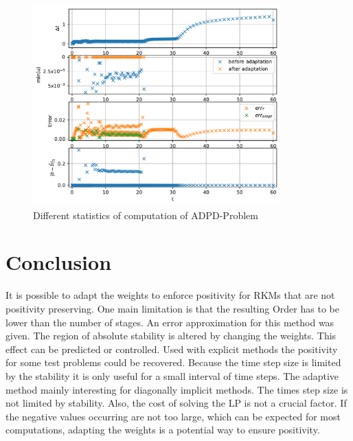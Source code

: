 \documentclass[a4paper]{article}
\numberwithin{equation}{section}
\theoremstyle{plain}
\theoremstyle{definition}
\numberwithin{theorem}{section}
\newcommand{\1}{\mathbbm{1}}
\begin{document}
\begin{figure}
\centering
\includegraphics[width=0.85\textwidth]{plots/ADP_stepsize,b.pdf}
\caption{Different statistics of computation of ADPD-Problem}
\label{fig:Stats_ADP}
\end{figure}


\section{Conclusion} \label{sec:conclusion}
It is possible to adapt the weights to enforce positivity for RKMs that are not positivity preserving. 
One main limitation is that the resulting Order has to be lower than the number of stages.  
An error approximation for this method was given.  
The region of absolute stability is altered by changing the weights. This effect can be predicted or controlled. 
Used with explicit methods the positivity for some test problems could be recovered.  
Because the time step size is limited by the stability it is only useful for a small interval of time steps. 
The adaptive method mainly interesting for diagonally implicit methods.  
The times step size is not limited by stability. 
Also, the cost of solving the LP is not a crucial factor.  
If the negative values occurring are not too large, which can be expected for most computations, adapting the weights is a potential way to ensure positivity. 




\printbibliography
\end{document}
